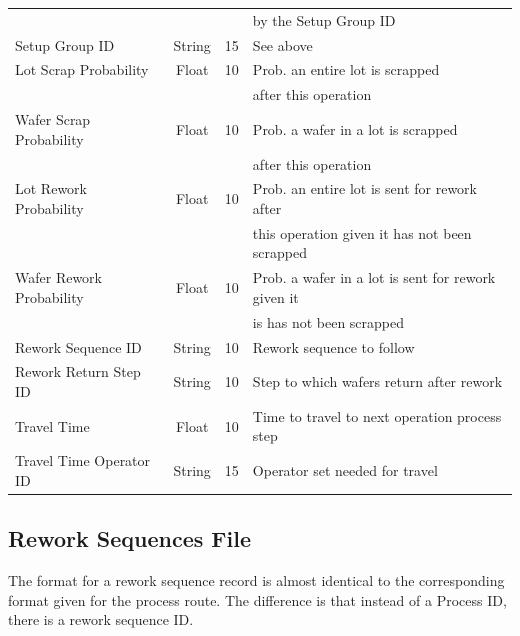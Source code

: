\begin{center}
\begin{tabular}{|l|c|c|l|}
    & & & by the Setup Group ID  \\
   Setup Group ID & String & 15 & See above \\
   Lot Scrap Probability & Float & 10 & Prob. an entire lot is scrapped \\
    & & & after this operation \\
   Wafer Scrap Probability & Float & 10 & Prob. a wafer in a lot is
   scrapped \\
    & & & after this operation \\
   Lot Rework Probability & Float & 10 & Prob. an entire lot is
   sent for rework after \\
    & & & this operation given it has not been scrapped \\
   Wafer Rework Probability & Float & 10 & Prob. a wafer in a lot
   is sent for rework given it \\
    & & & is has not been scrapped \\
   Rework Sequence ID & String & 10 & Rework sequence to follow \\
   Rework Return Step ID & String & 10 & Step to which wafers return
   after rework \\
   Travel Time & Float & 10 & Time to travel to next operation process step \\
   Travel Time Operator ID & String & 15 &  Operator set
   needed for travel \\ \hline
   \end{tabular}
   \end{center}

   \newpage
   
   \subsection{Rework Sequences File}
   The format for a rework sequence record is almost identical
   to the corresponding format given for the process route.  The
   difference  is that instead of a Process ID, there is
   a rework sequence ID.
   
